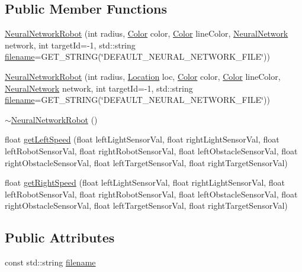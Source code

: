 \subsection*{Public Member Functions}
\begin{DoxyCompactItemize}
\item 
\hyperlink{classNeuralNetworkRobot_adee0b00b83cd1f9269efd5178f4320b3}{Neural\-Network\-Robot} (int radius, \hyperlink{structColor}{Color} color, \hyperlink{structColor}{Color} line\-Color, \hyperlink{classNeuralNetwork}{Neural\-Network} network, int target\-Id=-\/1, std\-::string \hyperlink{classNeuralNetworkRobot_a6ccb2a3dcfa6c5616fede96f7468d065}{filename}=G\-E\-T\-\_\-\-S\-T\-R\-I\-N\-G(\char`\"{}D\-E\-F\-A\-U\-L\-T\-\_\-\-N\-E\-U\-R\-A\-L\-\_\-\-N\-E\-T\-W\-O\-R\-K\-\_\-\-F\-I\-L\-E\char`\"{}))
\item 
\hyperlink{classNeuralNetworkRobot_a016aaca79a56d7cd2b04583188541359}{Neural\-Network\-Robot} (int radius, \hyperlink{structLocation}{Location} loc, \hyperlink{structColor}{Color} color, \hyperlink{structColor}{Color} line\-Color, \hyperlink{classNeuralNetwork}{Neural\-Network} network, int target\-Id=-\/1, std\-::string \hyperlink{classNeuralNetworkRobot_a6ccb2a3dcfa6c5616fede96f7468d065}{filename}=G\-E\-T\-\_\-\-S\-T\-R\-I\-N\-G(\char`\"{}D\-E\-F\-A\-U\-L\-T\-\_\-\-N\-E\-U\-R\-A\-L\-\_\-\-N\-E\-T\-W\-O\-R\-K\-\_\-\-F\-I\-L\-E\char`\"{}))
\item 
\hyperlink{classNeuralNetworkRobot_a881db4125bc7390a49f0603a51a38ff1}{$\sim$\-Neural\-Network\-Robot} ()
\item 
float \hyperlink{classNeuralNetworkRobot_a91c4210b62175e9ffb1ed3362df318af}{get\-Left\-Speed} (float left\-Light\-Sensor\-Val, float right\-Light\-Sensor\-Val, float left\-Robot\-Sensor\-Val, float right\-Robot\-Sensor\-Val, float left\-Obstacle\-Sensor\-Val, float right\-Obstacle\-Sensor\-Val, float left\-Target\-Sensor\-Val, float right\-Target\-Sensor\-Val)
\item 
float \hyperlink{classNeuralNetworkRobot_a7b3389e89eb3485ad9e074494624e204}{get\-Right\-Speed} (float left\-Light\-Sensor\-Val, float right\-Light\-Sensor\-Val, float left\-Robot\-Sensor\-Val, float right\-Robot\-Sensor\-Val, float left\-Obstacle\-Sensor\-Val, float right\-Obstacle\-Sensor\-Val, float left\-Target\-Sensor\-Val, float right\-Target\-Sensor\-Val)
\end{DoxyCompactItemize}
\subsection*{Public Attributes}
\begin{DoxyCompactItemize}
\item 
const std\-::string \hyperlink{classNeuralNetworkRobot_a6ccb2a3dcfa6c5616fede96f7468d065}{filename}
\end{DoxyCompactItemize}
